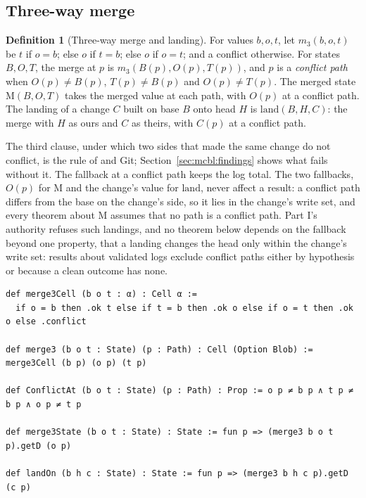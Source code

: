 \documentclass[11pt,letterpaper]{article}
\theoremstyle{definition}
\newtheorem{definition}[theorem]{Definition}
\theoremstyle{remark}
\newcommand{\op}[1]{\mathrm{#1}}
\newcommand{\lnd}{\op{land}}
\newcommand{\mrg}{\op{M}}
\begin{document}
\subsection{Three-way merge}

\begin{definition}[Three-way merge and landing]
\label{def:mcbl:merge}
For values $b,o,t$, let $m_3(b,o,t)$ be $t$ if $o=b$; else $o$ if $t=b$; else $o$ if $o=t$; and a conflict otherwise. For states $B,O,T$, the merge at $p$ is $m_3(B(p),O(p),T(p))$, and $p$ is a \emph{conflict path} when $O(p)\neq B(p)$, $T(p)\neq B(p)$ and $O(p)\neq T(p)$. The merged state $\mrg(B,O,T)$ takes the merged value at each path, with $O(p)$ at a conflict path. The landing of a change $C$ built on base $B$ onto head $H$ is $\lnd(B,H,C)$: the merge with $H$ as ours and $C$ as theirs, with $C(p)$ at a conflict path.
\end{definition}

The third clause, under which two sides that made the same change do not conflict, is the rule of  and Git; Section~\ref{sec:mcbl:findings} shows what fails without it. The fallback at a conflict path keeps the log total. The two fallbacks, $O(p)$ for $\mrg$ and the change's value for $\lnd$, never affect a result: a conflict path differs from the base on the change's side, so it lies in the change's write set, and every theorem about $\mrg$ assumes that no path is a conflict path. Part I's authority refuses such landings, and no theorem below depends on the fallback beyond one property, that a landing changes the head only within the change's write set: results about validated logs exclude conflict paths either by hypothesis or because a clean outcome has none.

\begin{lstlisting}[language=Lean,caption={Three-way merge and the landing state (\texttt{YonedaTx/Merge.lean})},label={lst:mcbl:merge}]
def merge3Cell (b o t : α) : Cell α :=
  if o = b then .ok t else if t = b then .ok o else if o = t then .ok o else .conflict

def merge3 (b o t : State) (p : Path) : Cell (Option Blob) := merge3Cell (b p) (o p) (t p)

def ConflictAt (b o t : State) (p : Path) : Prop := o p ≠ b p ∧ t p ≠ b p ∧ o p ≠ t p

def merge3State (b o t : State) : State := fun p => (merge3 b o t p).getD (o p)

def landOn (b h c : State) : State := fun p => (merge3 b h c p).getD (c p)
\end{lstlisting}
\end{document}
